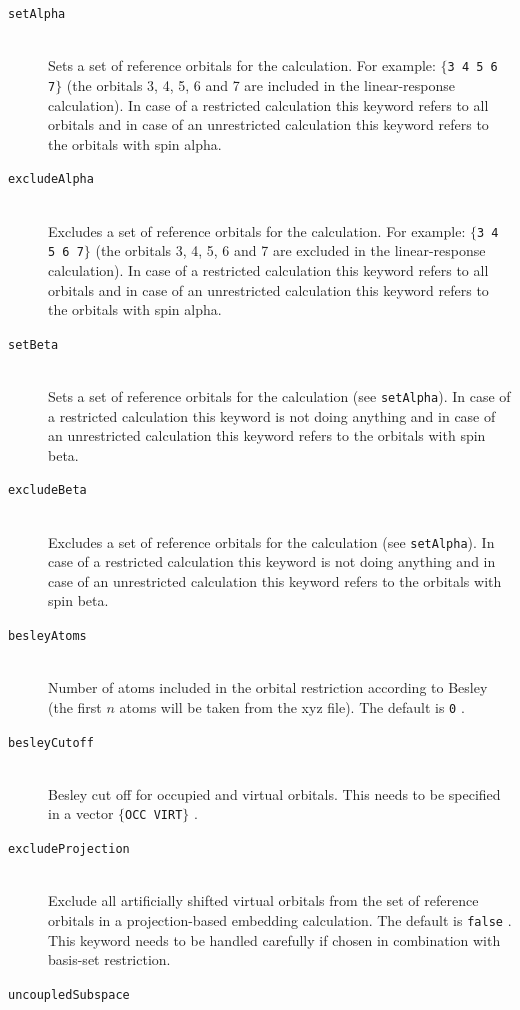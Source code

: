 \documentclass[bibliography=totocnumbered,a4paper,10pt,oneside]{scrbook}
\newcommand{\ttt}[1]{%
  \begingroup\setlength{\fboxsep}{1pt}%
  \colorbox{serenity-green!30}{\texttt{\hspace*{2pt}\vphantom{(g}#1\hspace*{2pt}}}%
  \endgroup
}
\begin{document}
\begin{description}
    \item [\texttt{setAlpha}]\hfill \\
    Sets a set of reference orbitals for the calculation. For example: \ttt{$\{$3 4 5 6 7$\}$} (the orbitals 3, 4, 5, 6 and 7 are included in the linear-response calculation). In case of a restricted calculation this keyword refers to all orbitals and in case of an unrestricted calculation this keyword refers to the orbitals with spin alpha.
    \item [\texttt{excludeAlpha}]\hfill \\
    Excludes a set of reference orbitals for the calculation. For example: \ttt{$\{$3 4 5 6 7$\}$} (the orbitals 3, 4, 5, 6 and 7 are excluded in the linear-response calculation). In case of a restricted calculation this keyword refers to all orbitals and in case of an unrestricted calculation this keyword refers to the orbitals with spin alpha.
    \item [\texttt{setBeta}]\hfill \\
    Sets a set of reference orbitals for the calculation (see \texttt{setAlpha}). In case of a restricted calculation this keyword is not doing anything and in case of an unrestricted calculation this keyword refers to the orbitals with spin beta.
    \item [\texttt{excludeBeta}]\hfill \\
    Excludes a set of reference orbitals for the calculation (see \texttt{setAlpha}). In case of a restricted calculation this keyword is not doing anything and in case of an unrestricted calculation this keyword refers to the orbitals with spin beta.
    \item [\texttt{besleyAtoms}]\hfill \\
    Number of atoms included in the orbital restriction according to Besley (the first $n$ atoms will be taken from the xyz file). The default is \ttt{0}.
    \item [\texttt{besleyCutoff}]\hfill \\
    Besley cut off for occupied and virtual orbitals. This needs to be specified in a vector \ttt{$\{$OCC VIRT$\}$}.
    \item [\texttt{excludeProjection}]\hfill \\
    Exclude all artificially shifted virtual orbitals from the set of reference orbitals in a projection-based embedding calculation. The default is \ttt{false}. This keyword needs to be handled carefully if chosen in combination with basis-set restriction.
    \item [\texttt{uncoupledSubspace}]\hfill \\

\end{description}
\end{document}
